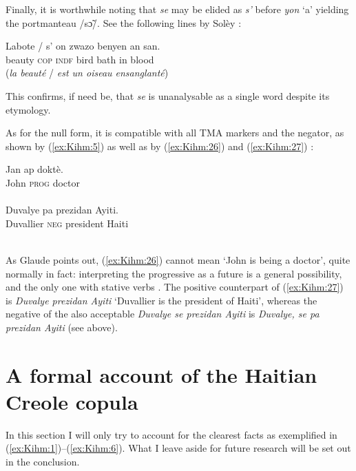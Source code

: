 \documentclass[output=paper]{langsci/langscibook}
\begin{document}
Finally, it is worthwhile noting that \emph{se} may be elided as
\emph{s'} before \emph{yon} `a' yielding the portmanteau /sɔ̃/. See the
following lines by Solèy %
\citep[22]{ChalmersKenolEtAl2015}%
%
:

\ea\label{ex:Kihm:25} \gll Labote  /  s' on zwazo benyen an san.\\
beauty {} \textsc{cop} \textsc{indf} bird bath in blood \\
\glt {} (\emph{la beauté} / \emph{est un oiseau ensanglanté}) \\
\z

This confirms, if need be, that \emph{se} is unanalysable as a single word
despite its etymology.

As for the null form, it is compatible with all TMA markers and the
negator, as shown by (\ref{ex:Kihm:5}) as well as by (\ref{ex:Kihm:26}) %
\citep[49]{Glaude2012} %
%
and (\ref{ex:Kihm:27})
%
\citep[114]{DeGraff2007}%
%
:


\ea\label{ex:Kihm:26} \gll Jan ap doktè.\\
John \textsc{prog} doctor \\
\glt {} \\

\ex\label{ex:Kihm:27} \gll Duvalye pa prezidan Ayiti.\\
Duvallier \textsc{neg} president Haiti \\
\glt {} \\
\z

As Glaude points out, (\ref{ex:Kihm:26}) cannot mean `John is being a doctor', quite
normally in fact: interpreting the progressive as a future is a general
possibility, and the only one with stative verbs %
\citep{Fattier2013}%
%
. The
positive counterpart of (\ref{ex:Kihm:27}) is \emph{Duvalye prezidan Ayiti} `Duvallier
is the president of Haiti', whereas the negative of the also acceptable
\emph{Duvalye se prezidan Ayiti} is \emph{Duvalye, se pa prezidan Ayiti}
(see above).

\section{A formal account of the Haitian Creole copula}

In this section I will only try to account for the clearest facts as
exemplified in (\ref{ex:Kihm:1})--(\ref{ex:Kihm:6}). What I leave aside for future research will be
set out in the conclusion.
\end{document}
